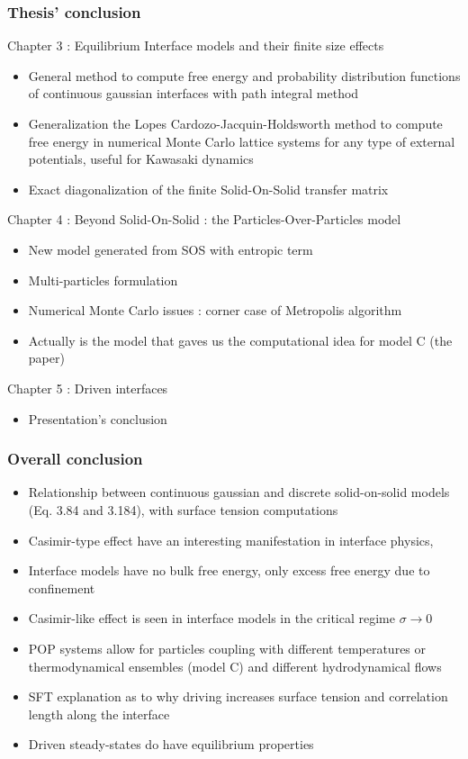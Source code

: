 \documentclass[9pt, dvipsnames]{beamer} %
\begin{document}
\begin{frame}
	\frametitle{Thesis' conclusion}
	\begin{block}{Chapter 3 : Equilibrium Interface models and their finite size effects}
	\begin{itemize}
		\item General method to compute free energy and probability distribution functions of continuous gaussian interfaces with path integral method
		\item Generalization the Lopes Cardozo-Jacquin-Holdsworth method to compute free energy in numerical Monte Carlo lattice systems for any type of external potentials, useful for Kawasaki dynamics
		\item Exact diagonalization of the finite Solid-On-Solid transfer matrix
	\end{itemize}
	\end{block}
	\begin{block}{Chapter 4 : Beyond Solid-On-Solid : the Particles-Over-Particles model}
	\begin{itemize}
		\item New model generated from SOS with entropic term
		\item Multi-particles formulation 
		\item Numerical Monte Carlo issues : corner case of Metropolis algorithm
		\item Actually is the model that gaves us the computational idea for model C (the paper)
	\end{itemize}
	\end{block}	
	\begin{block}{Chapter 5 : Driven interfaces}
	\begin{itemize}
		\item Presentation's conclusion
	\end{itemize}	
	\end{block}
\end{frame}

\begin{frame}
	\frametitle{Overall conclusion}
	\begin{itemize}
		\item Relationship between continuous gaussian and discrete solid-on-solid models (Eq. 3.84 and 3.184), with surface tension computations
		\item Casimir-type effect have an interesting manifestation in interface physics, 
		\item Interface models have no bulk free energy, only excess free energy due to confinement 
		\item Casimir-like effect is seen in interface models in the critical regime $\sigma \to 0$
		\item POP systems allow for particles coupling with different temperatures or thermodynamical ensembles (model C) and different hydrodynamical flows
		\item SFT explanation as to why driving increases surface tension and correlation length along the interface
		\item Driven steady-states do have equilibrium properties
	\end{itemize}
\end{frame}
\end{document}
